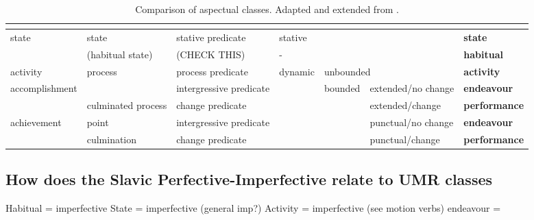 \begin{table}[]
    \begin{adjustbox}{width=\textwidth}
    \begin{tabular}{|l|l|l|l|l|l|l|}
    \hline
    \citet*{vendler57} &  \citet*{moens-steedman-1988-temporal}& \citet*{egg2005flexible} & \multicolumn{3}{l}{\citet*{annotAndAutoClassOfAspectCat}}  \vline & \citet{umr} \\ \hline \hline
\multirow{2}{*}{state}         & state                      & stative predicate     & \multicolumn{3}{l}{stative} \vline & \textbf{state} \\ \cline{2-7}
                               & (habitual state)           & (CHECK THIS)          & \multicolumn{3}{l}{-} \vline & \textbf{habitual} \\ \hline
activity                       & \multirow{2}{*}{process}   & process predicate     & \multirow{5}{*}{dynamic} & \multicolumn{2}{l}{unbounded} \vline & \textbf{activity} \\ \cline{1-1}\cline{3-3}\cline{5-7}
\multirow{2}{*}{accomplishment}&                            & intergressive predicate&      & \multirow{4}{*}{bounded} &  extended/no change & \textbf{endeavour} \\ \cline{2-3}\cline{6-7}
                               & culminated process         & change predicate      &       &  & extended/change & \textbf{performance}\\ \cline{1-3}\cline{6-7}
\multirow{2}{*}{achievement}   & point                      & intergressive predicate&      &  & punctual/no change & \textbf{endeavour} \\ \cline{2-3} \cline{6-7}
                               & culmination                & change predicate      &       &  & punctual/change & \textbf{performance} \\ \hline

    \end{tabular}
    \end{adjustbox}
    \caption{Comparison of aspectual classes. Adapted and extended from \citet*{annotAndAutoClassOfAspectCat}.}
    \label{table:aspect_classes_comparison}
\end{table}

\subsection{How does the Slavic Perfective-Imperfective relate to UMR classes}

Habitual = imperfective
State = imperfective (general imp?)
Activity = imperfective (see motion verbs)
endeavour = 

